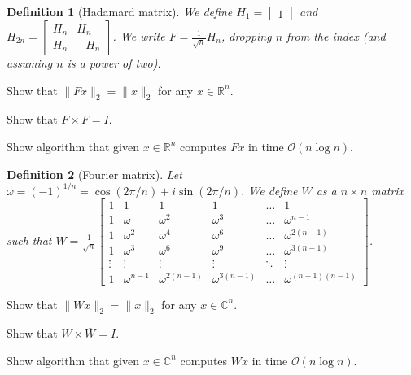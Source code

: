 \documentclass[12pt]{uebung}
\newtheorem{definition}{Definition}
\begin{document}
 

\newcommand{\bigo}{\mathcal{O}}
\renewcommand{\aufgname}{Exercise}

\begin{definition}[Hadamard matrix]
We define $H_1 = \begin{bmatrix} 1 \end{bmatrix}$ and $H_{2n} = \begin{bmatrix} H_n & H_n \\ H_n & -H_n \end{bmatrix}$. We  write $F = \frac{1}{\sqrt{n}} H_n$, dropping $n$ from the index (and assuming $n$ is a power of two).
\end{definition}

\begin{aufg}
Show that $\|F x\|_2 = \|x\|_2$ for any $x \in \mathbb{R}^n$.
\end{aufg}

\begin{aufg}
Show that $F \times F = I$.
\end{aufg}

\begin{aufg}
Show algorithm that given $x \in \mathbb{R}^n$ computes $Fx$ in time $\bigo(n \log n)$.
\end{aufg}

\vfill

\begin{definition}[Fourier matrix]
Let $\omega = (-1)^{1/n} = \cos(2\pi/n)+i \sin(2 \pi/n)$. We define $W$ as a $n\times n$ matrix such that 
$W = \frac{1}{\sqrt{n}} \begin{bmatrix} 1 & 1 & 1 & 1 & \hdots & 1\\ 1 & \omega & \omega^2 & \omega^3 & \hdots & \omega^{n-1}\\ 1 & \omega^2 & \omega^4 & \omega^6 & \hdots & \omega^{2(n-1)}\\ 1 & \omega^3 & \omega^6 & \omega^9 & \hdots & \omega^{3(n-1)}\\ \vdots & \vdots & \vdots & \vdots & \ddots & \vdots\\ 1 & \omega^{n-1} & \omega^{2(n-1)} & \omega^{3(n-1)} &  \hdots & \omega^{(n-1)(n-1)} \end{bmatrix}$.
\end{definition}

\begin{aufg}
Show that $\|W x\|_2 = \|x\|_2$ for any $x \in \mathbb{C}^n$.
\end{aufg}

\begin{aufg}
Show that $W \times \overline{W} = I$.
\end{aufg}

\begin{aufg}
Show algorithm that given $x \in \mathbb{C}^n$ computes $Wx$ in time $\bigo(n \log n)$.
\end{aufg}
\end{document}
